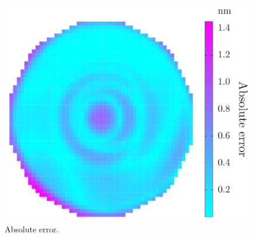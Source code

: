 \begin{figure}[b]
  \centering
  \vspace{-1.5em}
  \includegraphics[width=0.6\linewidth]{include/figures/wafer-qoi-error.pdf}
  \caption{Absolute error.}
\end{figure}
